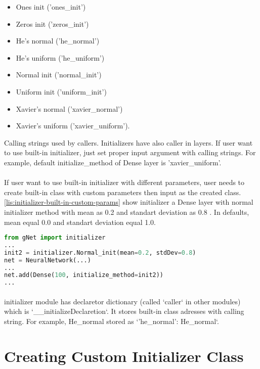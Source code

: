 \documentclass[12pt]{report}
\begin{document}
\begin{itemize}
 	\item Ones init ('ones\_init')
	\item Zeros init ('zeros\_init')
	\item He's normal ('he\_normal')
	\item He's uniform ('he\_uniform')
	\item Normal init ('normal\_init')
	\item Uniform init ('uniform\_init')
	\item Xavier's normal ('xavier\_normal')
	\item Xavier's uniform ('xavier\_uniform').
\end{itemize}

Calling strings used by callers. Initializers have also caller in layers. If user want to use built-in initializer, just set proper input argument with calling strings. For example, default initialize\_method of Dense layer is 'xavier\_uniform'.


\paragraph{}
If user want to use built-in initializer with different parameters, user needs to create built-in class with custom parameters then input as the created class. \ref{lis:initializer-built-in-custom-params} show initializer a Dense layer with normal initializer method with mean as 0.2 and standart deviation as 0.8 . In defaults, mean equal 0.0 and standart deviation equal 1.0.


\begin{lstlisting}[language=Python, numbers=none, caption={Built-in initializer with custom parameters.}, label={lis:initializer-built-in-custom-params}]
from gNet import initializer
...
init2 = initializer.Normal_init(mean=0.2, stdDev=0.8)
net = NeuralNetwork(...)
...
net.add(Dense(100, initialize_method=init2))
...
\end{lstlisting}

\paragraph{}
initializer module has declaretor dictionary (called `caller` in other modules) which is `\_\_initializeDeclaretion`. It stores built-in class adresses with calling string. For example, He\_normal stored as `'he\_normal': He\_normal`.

\section{Creating Custom Initializer Class}
\end{document}
